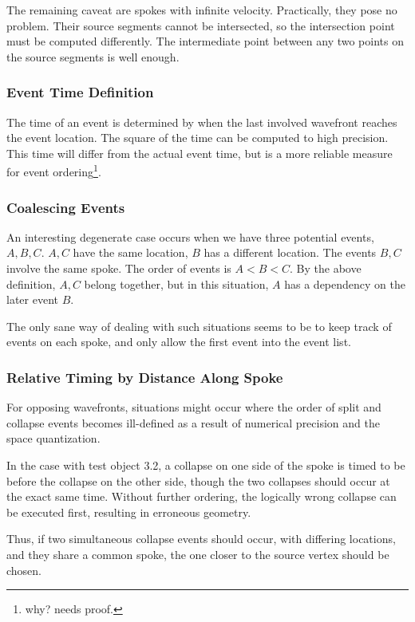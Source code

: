 \documentclass[12pt,a4paper,oneside,openany]{article}
\begin{document}
The remaining caveat are spokes with infinite velocity. Practically, they pose no problem. Their source segments cannot be intersected, so the intersection point must be computed differently. The intermediate point between any two points on the source segments is well enough.

\subsubsection{Event Time Definition}

The time of an event is determined by when the last involved wavefront reaches the event location. The square of the time can be computed to high precision. This time will differ from the actual event time, but is a more reliable measure for event ordering\footnote{why? needs proof.}.

\subsubsection{Coalescing Events}

An interesting degenerate case occurs when we have three potential events, $A,B,C$. $A,C$ have the same location, $B$ has a different location. The events $B,C$ involve the same spoke. The order of events is $A < B < C$. By the above definition, $A,C$ belong together, but in this situation, $A$ has a dependency on the later event $B$.

The only sane way of dealing with such situations seems to be to keep track of events on each spoke, and only allow the first event into the event list.



\subsubsection{Relative Timing by Distance Along Spoke}

For opposing wavefronts, situations might occur where the order of split and collapse events becomes ill-defined as a result of numerical precision and the space quantization.

In the case with test object 3.2, a collapse on one side of the spoke is timed to be before the collapse on the other side, though the two collapses should occur at the exact same time. Without further ordering, the logically wrong collapse can be executed first, resulting in erroneous geometry.

Thus, if two simultaneous collapse events should occur, with differing locations, and they share a common spoke, the one closer to the source vertex should be chosen.
\end{document}

